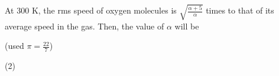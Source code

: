 \item At 300 K, the rms speed of oxygen molecules is $\sqrt{\frac{\alpha + 5}{\alpha}}$ times to that of its average speed in the gas. Then, the value of $\alpha$ will be \\
\begin{center}
    \begin{minipage}{1.5cm}
        \centering
        (used $\pi = \frac{22}{7}$)
    \end{minipage}
\end{center}
\begin{tasks}(2)
\end{tasks}